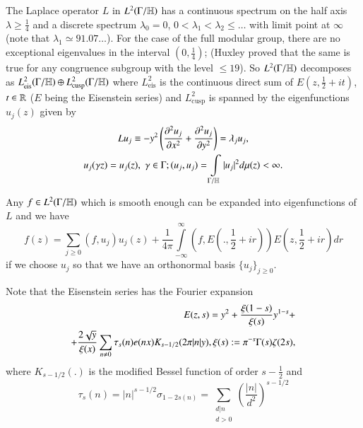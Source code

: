 The Laplace operator $L$ in $L^2 (\Gamma / \mathbb{H})$  has a continuous spectrum on the half axis $\lambda \geqslant \frac{1}{4}$ and a discrete spectrum $\lambda_0=0$, $0< \lambda_1 < \lambda_2 \leqslant \ldots$ with limit point at $\infty$ (note that $\lambda_1 \simeq 91.07\ldots$). For the case of the full modular group, there are no exceptional eigenvalues in the interval $(0, \frac{1}{4})$; (Huxley proved that the same is true for any congruence subgroup with the level $\leqslant 19$). So $L^2 (\Gamma / \mathbb{H})$ decomposes as $L^2_{\text{eis}} (\Gamma /\mathbb{H}) \oplus L^2_{\text{cusp}} (\Gamma / \mathbb{H})$ where $L^2_{\text{eis}}$ is the continuous  direct sum of $E(z, \frac{1}{2}+ it)$, $t \in \mathbb{R}$ ($E$ being the Eisenstein series) and $L^2_{\text{cusp}}$ is spanned by the eigenfunctions $u_j(z)$ given by 
\begin{gather*}
Lu_j \equiv - y^2 \left(\frac{\partial^2 u_j}{\partial x^2} + \frac{\partial^2 u_j}{\partial y^2} \right) = \lambda_j u_j, \label{art7-eq1.13}\\
u_j (\gamma z) = u_j  (z), \; \gamma \in \Gamma ; (u_j, u_j) = \int\limits_{\Gamma / \mathbb{H}} |u_j|^2 d\mu (z) < \infty.\notag
\end{gather*}

Any $f \in L^2 (\Gamma / \mathbb{H})$ which is smooth enough can be expanded into eigenfunctions of $L$ and we have 
\begin{equation}
f(z) = \sum\limits_{j \geqslant 0} (f, u_j) u_j (z)  + \frac{1}{4\pi} \int\limits^\infty_{-\infty} (f, E (., \frac{1}{2} + ir)) E (z, \frac{1}{2} + ir) dr \label{art7-eq1.14}
\end{equation}
if we choose $u_j$ so that we have an orthonormal basis $\{u_j\}_{j\geqslant 0}$.

Note that the Eisenstein series has the Fourier expansion
\begin{align}
E (z,s) = y^2 + \frac{\xi (1-s)}{\xi(s)} y^{1-s} + \label{art7-eq1.15} \\
+ \frac{2\sqrt{y}}{\xi (x)} \sum\limits_{n\neq 0} \tau_s (n) e (nx) K_{s-1/2} (2\pi |n| y), \xi (s) : = \pi^{-s} \Gamma (s) \zeta (2s), \notag
\end{align}
where $K_{s-1/2} (.)$ is the modified Bessel function of order $s - \frac{1}{2}$ and 
\begin{equation}
\tau_s (n) = |n|^{s-1/2} \sigma_{1-2s(n)} = \sum\limits_{\substack{d|n\\d>0}} \left(\frac{|n|}{d^2} \right)^{s-1/2} \label{art7-eq1.16}
\end{equation} 

